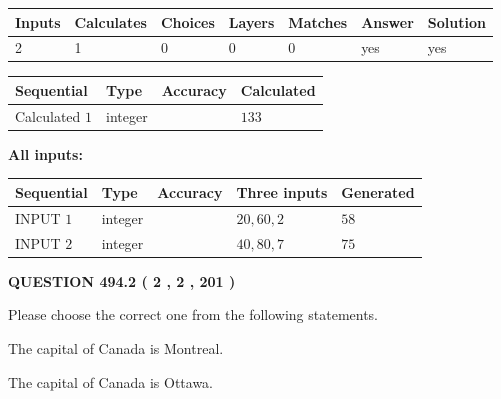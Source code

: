 \documentclass[12pt]{article}
\begin{document}
   
   
   
\noindent\begin{tabular}{|l|l|l|l|l|l|l|}
 \hline
Inputs & Calculates & Choices & Layers & Matches & Answer & Solution \\ \hline
 2  & 
 1  & 
 0
  & 
 0  & 
 0  & 
  yes & 
  yes 
  \\ \hline
 \end{tabular}
   
   
   
   
\noindent{}
   
   
  
  
\noindent\begin{tabular}{|l|l|l|l|}
\hline
 Sequential & Type & Accuracy & Calculated \\ 
\hline
 
 
  Calculated $  1 $ & integer &  & 
  $ 133 $ 
 \\  \hline  
 \end{tabular}
   
   
   
   
\noindent\vspace{0.1in}\hspace{-0.08in} {\textbf{\Large{All inputs: }}}
   
   
  
  
\noindent\begin{tabular}{|l|l|l|l|l|}
\hline
 Sequential & Type & Accuracy & Three inputs & Generated \\ 
\hline
 
 
  INPUT $  1 $ & integer &  & $
 20
 , 
 60
 , 
 2
 $ & $ 58 $ 
 \\  \hline  
 
 
  INPUT $  2 $ & integer &  & $
 40
 , 
 80
 , 
 7
 $ & $ 75 $ 
 \\  \hline  
 \end{tabular}
   
   
  
\vspace{0.2in}
  
{\textbf{\Large{QUESTION
494.2 
 ( 2 , 2 , 201 )
}}}
  
  
Please choose the correct one from the following statements.
 
 
The capital of Canada is Montreal.
 
 
The capital of Canada is Ottawa.
 
\end{document}
